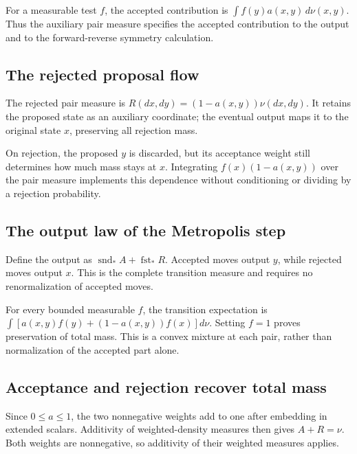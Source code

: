\documentclass[11pt,a4paper]{article}
\begin{document}
For a measurable test \(f\), the accepted contribution is \(\int f(y)a(x,y)\,d\nu(x,y)\). Thus the auxiliary pair measure specifies the accepted contribution to the output and to the forward-reverse symmetry calculation.


\subsection{\texorpdfstring{The rejected proposal flow}{The rejected proposal flow}}


The rejected pair measure is \(R(dx,dy)=(1-a(x,y))\nu(dx,dy)\). It retains the proposed state as an auxiliary coordinate; the eventual output maps it to the original state \(x\), preserving all rejection mass.



On rejection, the proposed \(y\) is discarded, but its acceptance weight still determines how much mass stays at \(x\). Integrating \(f(x)(1-a(x,y))\) over the pair measure implements this dependence without conditioning or dividing by a rejection probability.


\subsection{\texorpdfstring{The output law of the Metropolis step}{The output law of the Metropolis step}}


Define the output as \(\operatorname{snd}_*A+\operatorname{fst}_*R\). Accepted moves output \(y\), while rejected moves output \(x\). This is the complete transition measure and requires no renormalization of accepted moves.



For every bounded measurable \(f\), the transition expectation is \(\int[a(x,y)f(y)+(1-a(x,y))f(x)]d\nu\). Setting \(f=1\) proves preservation of total mass. This is a convex mixture at each pair, rather than normalization of the accepted part alone.


\subsection{\texorpdfstring{Acceptance and rejection recover total mass}{Acceptance and rejection recover total mass}}


Since \(0\le a\le1\), the two nonnegative weights add to one after embedding in extended scalars. Additivity of weighted-density measures then gives \(A+R=\nu\). Both weights are nonnegative, so additivity of their weighted measures applies.
\end{document}
